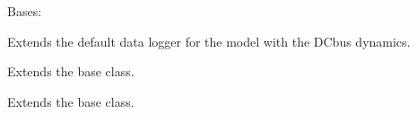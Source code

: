 \documentclass[letterpaper,10pt,english]{sphinxmanual}
\begin{document}
\begin{fulllineitems}
\label{\detokenize{model:model.im_drive.DataloggerExtended}}
\pysigstartsignatures
{}
\pysigstopsignatures
\sphinxAtStartPar
Bases: {\hyperref[\detokenize{model:model.im_drive.Datalogger}]{}}

\sphinxAtStartPar
Extends the default data logger for the model with the DC\sphinxhyphen{}bus dynamics.

\begin{fulllineitems}
\label{\detokenize{model:model.im_drive.DataloggerExtended.post_process}}
\pysigstartsignatures
{}
\pysigstopsignatures
\sphinxAtStartPar
Extends the base class.

\end{fulllineitems}


\begin{fulllineitems}
\label{\detokenize{model:model.im_drive.DataloggerExtended.save}}
\pysigstartsignatures
{}
\pysigstopsignatures
\sphinxAtStartPar
Extends the base class.

\end{fulllineitems}


\end{fulllineitems}

\end{document}
